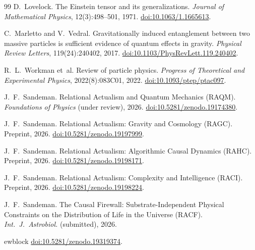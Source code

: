 \documentclass[11pt,a4paper]{article}
\begin{document}
\begin{thebibliography}{99}
D.~Lovelock.
\newblock The Einstein tensor and its generalizations.
\newblock \emph{Journal of Mathematical Physics}, 12(3):498--501, 1971.
\newblock \href{https://doi.org/10.1063/1.1665613}{doi:10.1063/1.1665613}.

C.~Marletto and V.~Vedral.
\newblock Gravitationally induced entanglement between two massive particles
  is sufficient evidence of quantum effects in gravity.
\newblock \emph{Physical Review Letters}, 119(24):240402, 2017.
\newblock \href{https://doi.org/10.1103/PhysRevLett.119.240402}%
  {doi:10.1103/PhysRevLett.119.240402}.

R.~L.~Workman et~al.
\newblock Review of particle physics.
\newblock \emph{Progress of Theoretical and Experimental Physics},
  2022(8):083C01, 2022.
\newblock \href{https://doi.org/10.1093/ptep/ptac097}{doi:10.1093/ptep/ptac097}.

J.~F.~Sandeman.
\newblock Relational Actualism and Quantum Mechanics (RAQM).
\newblock \emph{Foundations of Physics} (under review), 2026.
\newblock \href{https://doi.org/10.5281/zenodo.19174380}%
  {doi:10.5281/zenodo.19174380}.

J.~F.~Sandeman.
\newblock Relational Actualism: Gravity and Cosmology (RAGC).
\newblock Preprint, 2026.
\newblock \href{https://doi.org/10.5281/zenodo.19197999}%
  {doi:10.5281/zenodo.19197999}.

J.~F.~Sandeman.
\newblock Relational Actualism: Algorithmic Causal Dynamics (RAHC).
\newblock Preprint, 2026.
\newblock \href{https://doi.org/10.5281/zenodo.19198171}%
  {doi:10.5281/zenodo.19198171}.

J.~F.~Sandeman.
\newblock Relational Actualism: Complexity and Intelligence (RACI).
\newblock Preprint, 2026.
\newblock \href{https://doi.org/10.5281/zenodo.19198224}%
  {doi:10.5281/zenodo.19198224}.

J.~F.~Sandeman.
\newblock The Causal Firewall: Substrate-Independent Physical Constraints
  on the Distribution of Life in the Universe (RACF).
\newblock \textit{Int.\ J.\ Astrobiol.} (submitted), 2026.

ewblock \href{https://doi.org/10.5281/zenodo.19319374}{doi:10.5281/zenodo.19319374}.


\end{thebibliography}
\end{document}
